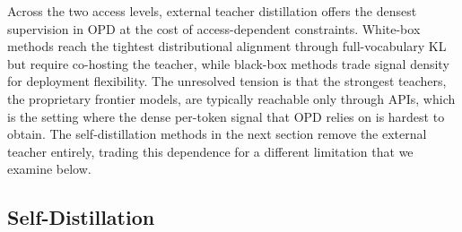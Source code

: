 \documentclass{article} %
\begin{document}
Across the two access levels, external teacher distillation offers the densest supervision in OPD at the cost of access-dependent constraints. White-box methods reach the tightest distributional alignment through full-vocabulary KL but require co-hosting the teacher, while black-box methods trade signal density for deployment flexibility. The unresolved tension is that the strongest teachers, the proprietary frontier models, are typically reachable only through APIs, which is the setting where the dense per-token signal that OPD relies on is hardest to obtain. The self-distillation methods in the next section remove the external teacher entirely, trading this dependence for a different limitation that we examine below.

\subsection{Self-Distillation}
\label{subsec:self_distill}
\end{document}
